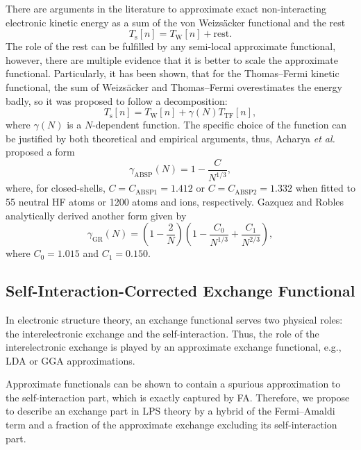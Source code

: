 \documentclass[%
 reprint,
 amsmath,amssymb,
 aps,
pra,
]{revtex4-2}
\begin{document}
There are arguments in the literature to approximate exact non-interacting electronic kinetic energy as a sum of the von Weizsäcker functional and the rest
\begin{equation}
    T_{\text{s}}[n]
    =
    T_{\text{W}}[n]
    +
    \text{rest}.
\end{equation}
The role of the rest can be fulfilled by any semi-local approximate functional, however, there are multiple evidence that it is better to scale the approximate functional. Particularly, it has been shown, that for the Thomas--Fermi kinetic functional, the sum of Weizsäcker and Thomas--Fermi overestimates the energy badly, so it was proposed to follow a decomposition:
\begin{equation}
    T_{\text{s}}[n]
    =
    T_{\text{W}}[n]
    +
    \gamma(N)
    T_{\text{TF}}[n],
\end{equation}
where $\gamma(N)$ is a $N$-dependent function. The specific choice of the function can be justified by both theoretical and empirical arguments, thus, Acharya \textit{et al.} proposed a form
\begin{equation}
    \gamma_{\text{ABSP}}(N)
    =
    1
    -
    \frac{C}{N^{1/3}},
\end{equation}
where, for closed-shells, $C = C_{\text{ABSP1}} = 1.412$ or $C = C_{\text{ABSP2}} = 1.332$ when fitted to 55 neutral HF atoms or 1200 atoms and ions, respectively. Gazquez and Robles analytically derived another form given by 
\begin{equation}
    \gamma_{\text{GR}}(N)
    =
    \left(
        1
        -
        \frac{2}{N}
    \right)
    \left(
        1
        -
        \frac{C_0}{N^{1/3}}
        +
        \frac{C_1}{N^{2/3}}
    \right),
\end{equation}
where $C_0 = 1.015$ and $C_1 = 0.150$.

\subsection{Self-Interaction-Corrected Exchange Functional}

In electronic structure theory, an exchange functional serves two physical roles: the interelectronic exchange and the self-interaction. Thus, the role of the interelectronic exchange is played by an approximate exchange functional, e.g., LDA or GGA approximations. 

Approximate functionals can be shown to contain a spurious approximation to the self-interaction part, which is exactly captured by FA. Therefore, we propose to describe an exchange part in LPS theory by a hybrid of the Fermi--Amaldi term and a fraction of the approximate exchange excluding its self-interaction part.
\end{document}
